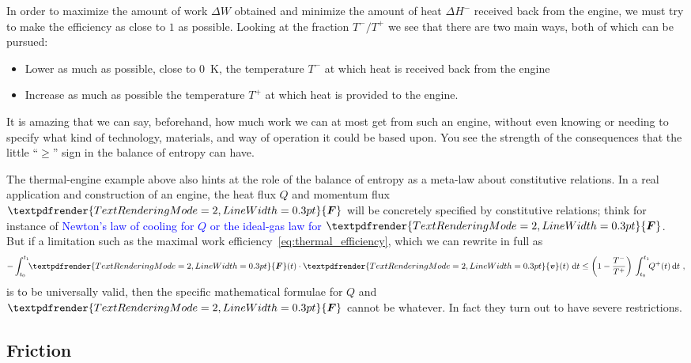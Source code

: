 \documentclass[a4paper,12pt,%
onecolumn,oneside,titlepage,%
british%
]{memoir}
\renewcommand*{\bm}[1]{\textpdfrender{TextRenderingMode=2,LineWidth=0.3pt}{\boldsymbol{#1}}}
\newcommand{\mynotew}[1]{{\footnotesize\color{midgrey}\faIcon{tools}\ #1}}
\newcommand*{\di}{\mathrm{d}}%
\newcommand*{\incr}{\Delta}%
\renewcommand*{\|}[1][]{\nonscript\:#1\vert\nonscript\:\mathopen{}}
\newcommand*{\sect}{\S}%
\renewcommand*{\autoref}[2]{\sidepar{\vspace{-1ex}\footnotesize{\color{blue}\faIcon{%
reply%
}\enspace\sect\,\ref{#1} page\,\pageref{#1}}}\textcolor{blue}{#2}}
\newcommand*{\yv}{\bm{v}}
\newcommand*{\yQ}{Q}%
\newcommand*{\yQp}{Q^{+}}%
\newcommand*{\yhem}{\incr H^{-}}%
\newcommand*{\yW}{\incr W}%
\newcommand*{\yF}{\bm{F}}
\newcommand*{\yte}{T}%
\newcommand*{\ytep}{\yte^{+}}%
\newcommand*{\ytem}{\yte^{-}}%
\newcommand*{\yti}{t_{0}}
\newcommand*{\ytf}{t_{1}}
\begin{document}
In order to maximize the amount of work $\yW$ obtained and minimize the amount of heat $\yhem$ received back from the engine, we must try to make the efficiency as close to $1$ as possible. Looking at the fraction $\ytem/\ytep$ we see that there are two main ways, both of which can be pursued:
\begin{itemize}
\item Lower as much as possible, close to \qty{0}{K}, the temperature $\ytem$ at which heat is received back from the engine
\item Increase as much as possible the temperature $\ytep$ at which heat is provided to the engine.
\end{itemize}

\medskip

It is amazing that we can say, beforehand, how much work we can at most get from such an engine, without even knowing or needing to specify what kind of technology, materials, and way of operation it could be based upon. You see the strength of the consequences that the little \enquote{$\ge$} sign in the balance of entropy can have.

The thermal-engine example above also hints at the role of the balance of entropy as a meta-law about constitutive relations. In a real application and construction of an engine, the heat flux $\yQ$ and momentum flux $\yF$ will be concretely specified by constitutive relations; think for instance of \autoref{sec:int_energy_idealgas}{Newton's law of cooling for $\yQ$ or the ideal-gas law for $\yF$}. But if a limitation such as the maximal work efficiency~\eqref{eq:thermal_efficiency}, which we can rewrite in full as
\begin{equation*}
  -\int_{\yti}^{\ytf}\!\!\yF(t)\cdot\yv(t)\ \di t
  \le
  \biggl(1-\frac{\ytem}{\ytep}\biggr)\,
  \int_{\yti}^{\ytf}\!\!\yQp(t)\,\di t \ ,
\end{equation*}
is to be universally valid, then the specific mathematical formulae for $\yQ$ and $\yF$ cannot be whatever. In fact they turn out to have severe restrictions.


\subsection{Friction}
\label{sec:friction_entropy}




\end{document}
